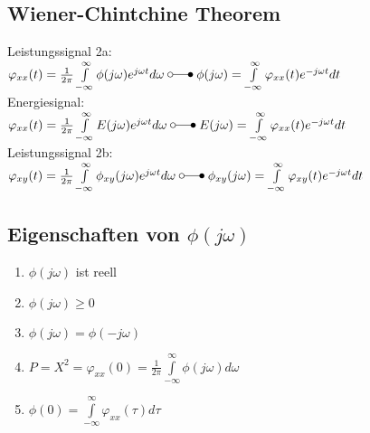 	\begin{minipage}[]{10cm}
	\subsection{Wiener-Chintchine Theorem }
		Leistungssignal 2a: \\
		$\varphi_{xx}(t) = \frac{1}{2\pi}\int\limits_{-\infty}^{\infty}\phi(j\omega)e^{j\omega t}d\omega \; \laplace \; \phi(j\omega) = \int\limits_{-\infty}^{\infty}\varphi_{xx}(t)e^{-j\omega t} dt \nonumber $\\
		Energiesignal: \\
		$\varphi_{xx}(t) = \frac{1}{2\pi}\int\limits_{-\infty}^{\infty}E(j\omega)e^{j\omega t}d\omega \; \laplace \; E(j\omega) = \int\limits_{-\infty}^{\infty}\varphi_{xx}(t)e^{-j\omega t} dt \nonumber $\\
		Leistungssignal 2b: \\
		$\varphi_{xy}(t) = \frac{1}{2\pi}\int\limits_{-\infty}^{\infty}\phi_{xy}(j\omega)e^{j\omega t}d\omega \; \laplace \;
		\phi_{xy}(j\omega) = \int\limits_{-\infty}^{\infty}\varphi_{xy}(t)e^{-j\omega t} dt \nonumber$
	\end{minipage}
	\begin{minipage}[]{8cm}
	\subsection{Eigenschaften von $\phi(j\omega)$}
		\begin{enumerate}
			\item	$\phi(j\omega)$ ist reell
			\item $\phi(j\omega) \geq 0$
			\item $\phi(j\omega) = \phi(-j\omega)$
			\item $P = X^2 = \varphi_{xx}(0) = \frac{1}{2\pi} \int\limits_{-\infty}^{\infty} \phi(j\omega) d\omega$
			\item $\phi(0) = \int\limits_{-\infty}^{\infty} \varphi_{xx}(\tau)d\tau$
		\end{enumerate}
	\end{minipage}